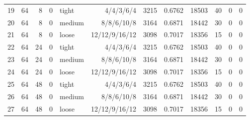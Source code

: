 \begin{table}[t]
{\begin{tabular}{rrrrlrrrrrrr}
19 & 64 & 8 & 0 & tight & 4/4/3/6/4 & 3215 & 0.6762 & 18503 & 40 & 0 & 0 \\
20 & 64 & 8 & 0 & medium & 8/8/6/10/8 & 3164 & 0.6871 & 18442 & 30 & 0 & 0 \\
21 & 64 & 8 & 0 & loose & 12/12/9/16/12 & 3098 & 0.7017 & 18356 & 15 & 0 & 0 \\
22 & 64 & 24 & 0 & tight & 4/4/3/6/4 & 3215 & 0.6762 & 18503 & 40 & 0 & 0 \\
23 & 64 & 24 & 0 & medium & 8/8/6/10/8 & 3164 & 0.6871 & 18442 & 30 & 0 & 0 \\
24 & 64 & 24 & 0 & loose & 12/12/9/16/12 & 3098 & 0.7017 & 18356 & 15 & 0 & 0 \\
25 & 64 & 48 & 0 & tight & 4/4/3/6/4 & 3215 & 0.6762 & 18503 & 40 & 0 & 0 \\
26 & 64 & 48 & 0 & medium & 8/8/6/10/8 & 3164 & 0.6871 & 18442 & 30 & 0 & 0 \\
27 & 64 & 48 & 0 & loose & 12/12/9/16/12 & 3098 & 0.7017 & 18356 & 15 & 0 & 0 \\
\bottomrule
\end{tabular}}
\end{table}
